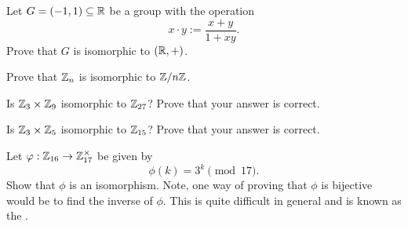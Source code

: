 \documentclass{ximera}
\begin{document}
\begin{exercise}
  Let $G = (-1,1)\subseteq \mathbb R$ be a group with the operation
  \[
  x\cdot y := \frac{x+y}{1+xy}.
  \]
  Prove that $G$ is isomorphic to $(\mathbb R,+)$.
\end{exercise}

\begin{exercise}
  Prove that $\mathbb Z_n$ is isomorphic to $\mathbb Z/n\mathbb Z$.
\end{exercise}


\begin{exercise}
  Is $\mathbb Z_3\times \mathbb Z_9$ isomorphic to $\mathbb Z_{27}$? Prove that your answer
  is correct.
\end{exercise}

\begin{exercise}
  Is $\mathbb Z_3\times \mathbb Z_5$ isomorphic to $\mathbb Z_{15}$? Prove that your answer
  is correct.
\end{exercise}

\begin{exercise}
  Let $\varphi:\mathbb Z_{16}\to\mathbb Z_{17}^\times$ be given by
  \[
  \phi(k)= 3^k \pmod{17}.
  \]
  Show that $\phi$ is an isomorphism. Note, one way of proving that
  $\phi$ is bijective would be to find the inverse of $\phi$. This is
  quite difficult in general and is known as the .
\end{exercise}





\end{document}
